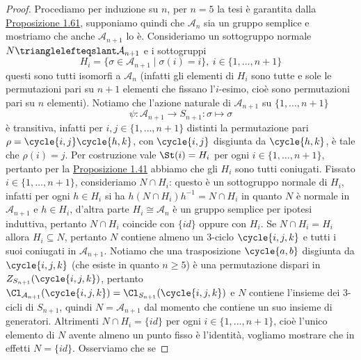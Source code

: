 \documentclass[11pt]{scrartcl}
\begin{document}
	\begin{proof}
		Procediamo per induzione su $n$, per $n = 5$ la tesi è garantita dalla 
		\hyperref[prop1.61]{Proposizione 1.61}, supponiamo quindi che $\mathcal{A}_n$
		sia un gruppo semplice e mostriamo che anche $\mathcal{A}_{n + 1}$ lo è.
		Consideriamo un sottogruppo normale $N \trianglelefteqslant \mathcal{A}_{n + 1}$
		e i sottogruppi 
		\[
		H_i = \{\sigma \in \mathcal{A}_{n + 1}\mid \sigma(i) = i\},~
		i \in \{1, \ldots, n + 1\}
		\]
		questi sono tutti isomorfi a $\mathcal{A}_n$ (infatti
		gli elementi di $H_i$ sono tutte e sole le permutazioni pari su $n + 1$
		elementi che fissano l'$i$-esimo, cioè sono permutazioni pari su $n$ elementi).
		Notiamo che l'azione naturale di $\mathcal{A}_{n + 1}$ su $\{1, \ldots, n + 1\}$
		\[
		\psi:\mathcal{A}_{n + 1} \longrightarrow S_{n + 1} :\sigma \longmapsto \sigma
		\]
		è transitiva, infatti per $i, j \in \{1, \ldots, n + 1\}$ distinti 
		la permutazione pari $\rho =\nolinebreak \cycle{i, j}\cycle{h, k}$, con $\cycle{i, j}$
		disgiunta da $\cycle{h, k}$, è tale che $\rho(i) = j$. Per costruzione 
		vale $\St(i) = H_i$ per ogni $i \in \{1, \ldots, n + 1\}$, pertanto
		per la \hyperref[prop1.41]{Proposizione 1.41} abbiamo che gli $H_i$ sono 
		tutti coniugati.\newline
		Fissato $i \in \{1, \ldots, n + 1\}$, consideriamo $N \cap H_i$: questo
		è un sottogruppo normale di $H_i$, infatti per ogni $h \in H_i$ si ha 
		$h(N\cap H_i)h^{-1} = N\cap H_i$ in quanto $N$ è normale in $\mathcal{A}_{n + 1}$
		e $h \in H_i$, d'altra parte $H_i \cong \mathcal{A}_n$ è un gruppo semplice
		per ipotesi induttiva, pertanto $N\cap H_i$ coincide con $\{id\}$ oppure 
		con $H_i$. \newline
		Se $N \cap H_i = H_i$ allora $H_i \subseteq N$, pertanto $N$ 
		contiene almeno un 3-ciclo $\cycle{i, j, k}$ e tutti i suoi coniugati in 
		$\mathcal{A}_{n + 1}$. Notiamo che una trasposizione $\cycle{a, b}$
		disgiunta da $\cycle{i, j, k}$ (che esiste in quanto $n \geq 5$) è una
		permutazione dispari in $Z_{S_{n + 1}}(\cycle{i, j, k})$, pertanto 
		$\Cl_{\mathcal{A}_{n + 1}}(\cycle{i, j, k}) = \Cl_{S_{n + 1}}(\cycle{i, j, k})$
		e $N$ contiene l'insieme dei 3-cicli di $S_{n + 1}$, quindi $N = 
		\mathcal{A}_{n + 1}$ dal momento che contiene un suo insieme di generatori.
		\newline
		Altrimenti $N\cap H_i = \{id\}$ per ogni $i \in \{1, \ldots, n + 1\}$,
		cioè l'unico elemento di $N$ avente almeno un punto fisso è l'identità,
		vogliamo mostrare che in effetti $N = \{id\}$. Osserviamo che se

\end{proof}
\end{document}
